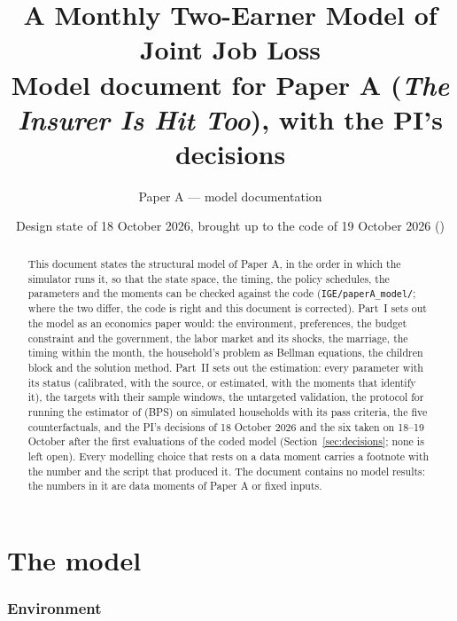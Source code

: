 \documentclass[11pt]{article}
\title{A Monthly Two-Earner Model of Joint Job Loss\\[4pt]
\large Model document for Paper A (\emph{The Insurer Is Hit Too}), with the PI's decisions}
\author{Paper A --- model documentation}
\date{Design state of 18 October 2026, brought up to the code of 19 October 2026 (\code{IGE/paperA\_model/})}
\newcommand{\code}[1]{\texttt{#1}}
\newcommand{\1}{\mathbf{1}}
\begin{document}
\maketitle

\begin{abstract}
\noindent This document states the structural model of Paper A, in the order in which the simulator runs it, so that
the state space, the timing, the policy schedules, the parameters and the moments can be checked against the code
(\code{IGE/paperA\_model/}; where the two differ, the code is right and this document is corrected). Part~I sets out the model as an economics paper would: the environment, preferences, the budget
constraint and the government, the labor market and its shocks, the marriage, the timing within the month, the
household's problem as Bellman equations, the children block and the solution method. Part~II sets out the
estimation: every parameter with its status (calibrated, with the source, or estimated, with the moments that identify
it), the targets with their sample windows, the untargeted validation, the protocol for running the estimator of
\citet{blundell2016consumption} (BPS) on simulated households with its pass criteria, the five counterfactuals, and the
PI's decisions of 18 October 2026 and the six taken on 18--19 October after the first evaluations of the coded model
(Section~\ref{sec:decisions}; none is left open). Every modelling choice that rests on
a data moment carries a footnote with the number and the script that produced it. The document contains no model results: the numbers in it are data moments of Paper A or
fixed inputs.
\end{abstract}

\tableofcontents
\newpage

\part{The model}

\section{Environment}\label{sec:env}
\end{document}

